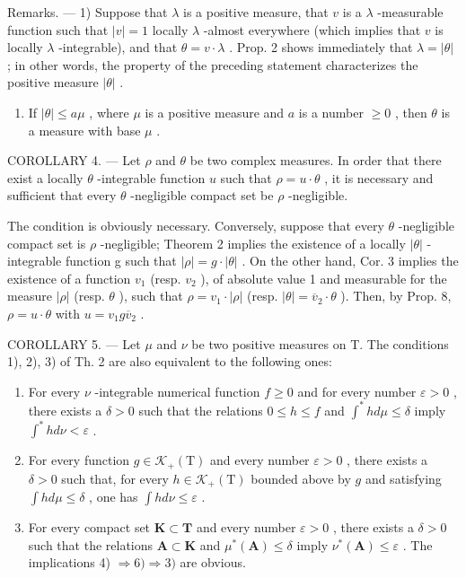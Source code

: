 Remarks. --- 1) Suppose that \(\lambda\) is a positive measure, that \(v\) is a \(\lambda\) -measurable function such that \(|v| = 1\) locally \(\lambda\) -almost everywhere (which implies that \(v\) is locally \(\lambda\) -integrable), and that \(\theta = v \cdot \lambda\) . Prop. 2 shows immediately that \(\lambda = |\theta|\) ; in other words, the property of the preceding statement characterizes the positive measure \(|\theta|\) .

\begin{enumerate}
\def\labelenumi{\arabic{enumi})}
\setcounter{enumi}{1}
\tightlist
\item
  If \(|\theta| \leqslant a\mu\) , where \(\mu\) is a positive measure and \(a\) is a number \(\geqslant 0\) , then \(\theta\) is a measure with base \(\mu\) .
\end{enumerate}

COROLLARY 4. --- Let \(\rho\) and \(\theta\) be two complex measures. In order that there exist a locally \(\theta\) -integrable function \(u\) such that \(\rho = u \cdot \theta\) , it is necessary and sufficient that every \(\theta\) -negligible compact set be \(\rho\) -negligible.

The condition is obviously necessary. Conversely, suppose that every \(\theta\) -negligible compact set is \(\rho\) -negligible; Theorem 2 implies the existence of a locally \(|\theta|\) -integrable function g such that \(|\rho| = g \cdot |\theta|\) . On the other hand, Cor. 3 implies the existence of a function \(v_{1}\) (resp. \(v_{2}\) ), of absolute value 1 and measurable for the measure \(|\rho|\) (resp. \(\theta\) ), such that \(\rho = v_{1} \cdot |\rho|\) (resp. \(|\theta| = \overline{v}_{2} \cdot \theta\) ). Then, by Prop. 8, \(\rho = u \cdot \theta\) with \(u = v_{1}g\overline{v}_{2}\) .

COROLLARY 5. --- Let \(\mu\) and \(\nu\) be two positive measures on T. The conditions 1), 2), 3) of Th. 2 are also equivalent to the following ones:

\begin{enumerate}
\def\labelenumi{\arabic{enumi})}
\setcounter{enumi}{3}
\item
  For every \(\nu\) -integrable numerical function \(f \geqslant 0\) and for every number \(\varepsilon > 0\) , there exists a \(\delta > 0\) such that the relations \(0 \leqslant h \leqslant f\) and \(\int^{*} h d\mu \leqslant \delta\) imply \(\int^{*} h d\nu < \varepsilon\) .
\item
  For every function \(g \in \mathcal{K}_{+}(\mathrm{T})\) and every number \(\varepsilon > 0\) , there exists a \(\delta > 0\) such that, for every \(h \in \mathcal{K}_{+}(\mathrm{T})\) bounded above by \(g\) and satisfying \(\int h d\mu \leqslant \delta\) , one has \(\int h d\nu \leqslant \varepsilon\) .
\item
  For every compact set \(\mathbf{K} \subset \mathbf{T}\) and every number \(\varepsilon > 0\) , there exists a \(\delta > 0\) such that the relations \(\mathbf{A} \subset \mathbf{K}\) and \(\mu^{*}(\mathbf{A}) \leqslant \delta\) imply \(\nu^{*}(\mathbf{A}) \leqslant \varepsilon\) . The implications 4) \(\Rightarrow 6) \Rightarrow 3)\) are obvious.
\end{enumerate}

